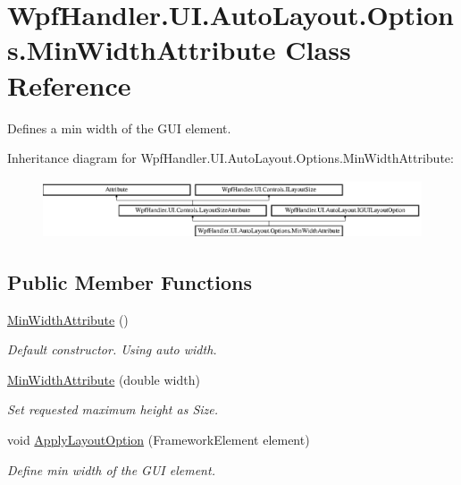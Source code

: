 \hypertarget{class_wpf_handler_1_1_u_i_1_1_auto_layout_1_1_options_1_1_min_width_attribute}{}\section{Wpf\+Handler.\+U\+I.\+Auto\+Layout.\+Options.\+Min\+Width\+Attribute Class Reference}
\label{class_wpf_handler_1_1_u_i_1_1_auto_layout_1_1_options_1_1_min_width_attribute}


Defines a min width of the G\+UI element.  


Inheritance diagram for Wpf\+Handler.\+U\+I.\+Auto\+Layout.\+Options.\+Min\+Width\+Attribute\+:\begin{figure}[H]
\begin{center}
\leavevmode
\includegraphics[height=1.750000cm]{d2/d96/class_wpf_handler_1_1_u_i_1_1_auto_layout_1_1_options_1_1_min_width_attribute}
\end{center}
\end{figure}
\subsection*{Public Member Functions}
\begin{DoxyCompactItemize}
\item 
\mbox{\hyperlink{class_wpf_handler_1_1_u_i_1_1_auto_layout_1_1_options_1_1_min_width_attribute_a9b1911633fbe6a02f618cc6a8011013f}{Min\+Width\+Attribute}} ()
\begin{DoxyCompactList}\small\item\em Default constructor. Using auto width. \end{DoxyCompactList}\item 
\mbox{\hyperlink{class_wpf_handler_1_1_u_i_1_1_auto_layout_1_1_options_1_1_min_width_attribute_a073c7f0b94a87b68e71267c6a18c3ba3}{Min\+Width\+Attribute}} (double width)
\begin{DoxyCompactList}\small\item\em Set requested maximum height as Size. \end{DoxyCompactList}\item 
void \mbox{\hyperlink{class_wpf_handler_1_1_u_i_1_1_auto_layout_1_1_options_1_1_min_width_attribute_a22bf72913c8d5d9f958d1edb1b52beda}{Apply\+Layout\+Option}} (Framework\+Element element)
\begin{DoxyCompactList}\small\item\em Define min width of the G\+UI element. \end{DoxyCompactList}\end{DoxyCompactItemize}
